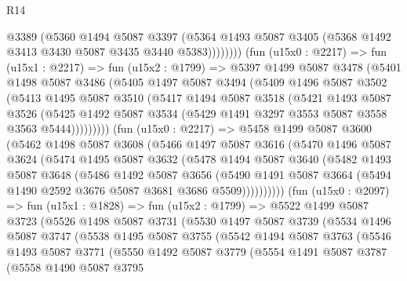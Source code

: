 \begin{lexlean}{R14}
\begin{coremodule}
              @3389
              (@5360
                @1494
                @5087
                @3397
                (@5364 @1493 @5087 @3405 (@5368 @1492 @3413 @3430 @5087 @3435 @3440 @5383))))))))
    (fun (u15x0 : @2217) =>
    fun (u15x1 : @2217) =>
    fun (u15x2 : @1799) =>
    @5397
      @1499
      @5087
      @3478
      (@5401
        @1498
        @5087
        @3486
        (@5405
          @1497
          @5087
          @3494
          (@5409
            @1496
            @5087
            @3502
            (@5413
              @1495
              @5087
              @3510
              (@5417
                @1494
                @5087
                @3518
                (@5421
                  @1493
                  @5087
                  @3526
                  (@5425 @1492 @5087 @3534 (@5429 @1491 @3297 @3553 @5087 @3558 @3563 @5444)))))))))
    (fun (u15x0 : @2217) =>
    @5458
      @1499
      @5087
      @3600
      (@5462
        @1498
        @5087
        @3608
        (@5466
          @1497
          @5087
          @3616
          (@5470
            @1496
            @5087
            @3624
            (@5474
              @1495
              @5087
              @3632
              (@5478
                @1494
                @5087
                @3640
                (@5482
                  @1493
                  @5087
                  @3648
                  (@5486
                    @1492
                    @5087
                    @3656
                    (@5490
                      @1491
                      @5087
                      @3664
                      (@5494 @1490 @2592 @3676 @5087 @3681 @3686 @5509))))))))))
    (fun (u15x0 : @2097) =>
    fun (u15x1 : @1828) =>
    fun (u15x2 : @1799) =>
    @5522
      @1499
      @5087
      @3723
      (@5526
        @1498
        @5087
        @3731
        (@5530
          @1497
          @5087
          @3739
          (@5534
            @1496
            @5087
            @3747
            (@5538
              @1495
              @5087
              @3755
              (@5542
                @1494
                @5087
                @3763
                (@5546
                  @1493
                  @5087
                  @3771
                  (@5550
                    @1492
                    @5087
                    @3779
                    (@5554
                      @1491
                      @5087
                      @3787
                      (@5558
                        @1490
                        @5087
                        @3795

\end{coremodule}
\end{lexlean}
